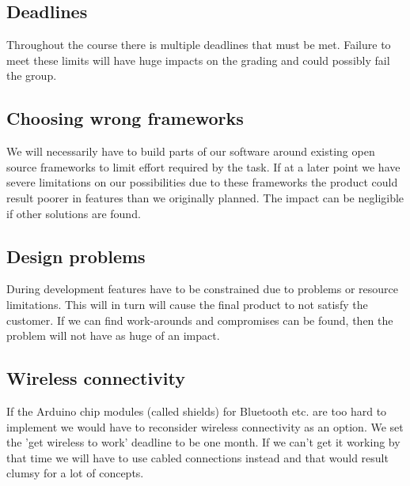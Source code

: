 \subsection{Deadlines}
Throughout the course there is multiple deadlines that must be met. Failure to meet
these limits will have huge impacts on the grading and could possibly fail the group.

\subsection{Choosing wrong frameworks}
We will necessarily have to build parts of our software around existing open source
frameworks to limit effort required by the task. If at a later point we have severe limitations
on our possibilities due to these frameworks the product could result poorer in features than
we originally planned. The impact can be negligible if other solutions are found.

\subsection{Design problems}
During development features have to be constrained due to problems or resource limitations.
This will in turn will cause the final product to not satisfy the customer. If we can find work-arounds
and compromises can be found, then the problem will not have as huge of an impact.

\subsection{Wireless connectivity}
If the Arduino chip modules (called shields) for Bluetooth etc. are too hard to implement
we would have to reconsider wireless connectivity as an option.
We set the 'get wireless to work' deadline to be one month. If we can't get it working
by that time we will have to use cabled connections instead and that would result clumsy
for a lot of concepts.

